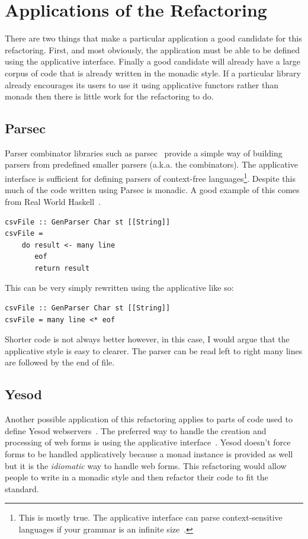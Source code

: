 \section{Applications of the Refactoring}
\label{sec:appApps}

There are two things that make a particular application a good candidate for this refactoring. First, and most obviously, the application must be able to be defined using the applicative interface. Finally a good candidate will already have a large corpus of code that is already written in the monadic style. If a particular library already encourages its users to use it using applicative functors rather than monads then there is little work for the refactoring to do.

\subsection{Parsec}
Parser combinator libraries such as parsec~\citep{parsec} provide a simple way of building parsers from predefined smaller parsers (a.k.a. the combinators). The applicative interface is sufficient for defining parsers of context-free languages\footnote{This is mostly true. The applicative interface can parse context-sensitive languages if your grammar is an infinite size~\citep{appContextSens}.}. Despite this much of the code written using Parsec is monadic. A good example of this comes from Real World Haskell~\citep{realWorldHaskell}.

\begin{lstlisting}[frame=tblr]
csvFile :: GenParser Char st [[String]]
csvFile = 
    do result <- many line
       eof
       return result
\end{lstlisting}

This can be very simply rewritten using the applicative like so:

\begin{lstlisting}[frame=tblr]
csvFile :: GenParser Char st [[String]]
csvFile = many line <* eof 
\end{lstlisting}      
 
 Shorter code is not always better however, in this case,  I would argue that the applicative style is easy to clearer. The parser can be read left to right many lines are followed by the end of file.
 
\subsection{Yesod}
Another possible application of this refactoring applies to parts of code used to define Yesod webservers~\citep{yesod}. The preferred way to handle the creation and processing of web forms is using the applicative interface~\citep{yesodBook}. Yesod doesn't force forms to be handled applicatively because a monad instance is provided as well but it is the \textit{idiomatic} way to handle web forms. This refactoring would allow people to write in a monadic style and then refactor their code to fit the standard.

